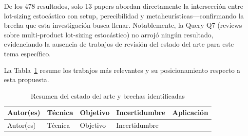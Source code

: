 \documentclass[
  spanish,
  12pt,
]{article}
\begin{document}
De los 478 resultados, solo 13 papers abordan directamente la
intersección entre lot-sizing estocástico con setup, perecibilidad y
metaheurísticas---confirmando la brecha que esta investigación busca
llenar. Notablemente, la Query Q7 (reviews sobre multi-product
lot-sizing estocástico) no arrojó ningún resultado, evidenciando la
ausencia de trabajos de revisión del estado del arte para este tema
específico.

La Tabla~\ref{tbl:tabla_3} resume los trabajos más relevantes y su
posicionamiento respecto a esta propuesta.

\begin{longtable}[]{@{}
  >{\raggedright\arraybackslash}p{}
  >{\raggedright\arraybackslash}p{}
  >{\raggedright\arraybackslash}p{}
  >{\raggedright\arraybackslash}p{}
  >{\raggedright\arraybackslash}p{}@{}}
\caption{\label{tbl:tabla_3}Resumen del estado del arte y brechas
identificadas}\tabularnewline
\toprule\noalign{}
\begin{minipage}[b]{\linewidth}\raggedright
Autor(es)
\end{minipage} & \begin{minipage}[b]{\linewidth}\raggedright
Técnica
\end{minipage} & \begin{minipage}[b]{\linewidth}\raggedright
Objetivo
\end{minipage} & \begin{minipage}[b]{\linewidth}\raggedright
Incertidumbre
\end{minipage} & \begin{minipage}[b]{\linewidth}\raggedright
Aplicación
\end{minipage} \\
\midrule\noalign{}
\endfirsthead
\toprule\noalign{}
\begin{minipage}[b]{\linewidth}\raggedright
Autor(es)
\end{minipage} & \begin{minipage}[b]{\linewidth}\raggedright
Técnica
\end{minipage} & \begin{minipage}[b]{\linewidth}\raggedright
Objetivo
\end{minipage} & \begin{minipage}[b]{\linewidth}\raggedright
Incertidumbre
\end{minipage} & \begin{minipage}[b]{\linewidth}\raggedright

\end{minipage}
\end{longtable}
\end{document}

